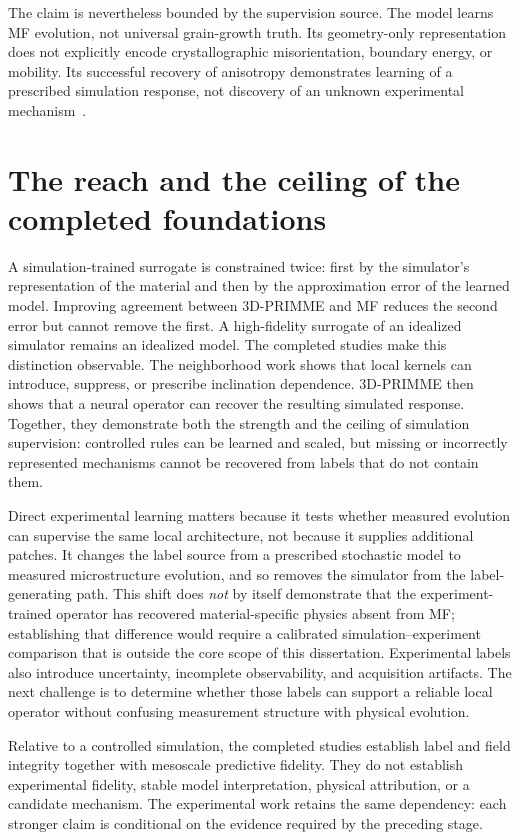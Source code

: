 \documentclass[proposalMode]{ufdissertation}
\begin{document}
The claim is nevertheless bounded by the supervision source. The model learns MF evolution, not universal grain-growth truth. Its geometry-only representation does not explicitly encode crystallographic misorientation, boundary energy, or mobility. Its successful recovery of anisotropy demonstrates learning of a prescribed simulation response, not discovery of an unknown experimental mechanism~\cite{tian2026threeDprimme}.

\bigskip

\section{The reach and the ceiling of the completed foundations}

A simulation-trained surrogate is constrained twice: first by the simulator's representation of the material and then by the approximation error of the learned model. Improving agreement between 3D-PRIMME and MF reduces the second error but cannot remove the first. A high-fidelity surrogate of an idealized simulator remains an idealized model.
The completed studies make this distinction observable. The neighborhood work shows that local kernels can introduce, suppress, or prescribe inclination dependence. 3D-PRIMME then shows that a neural operator can recover the resulting simulated response. Together, they demonstrate both the strength and the ceiling of simulation supervision: controlled rules can be learned and scaled, but missing or incorrectly represented mechanisms cannot be recovered from labels that do not contain them.

Direct experimental learning matters because it tests whether measured evolution can supervise the same local architecture, not because it supplies additional patches. It changes the label source from a prescribed stochastic model to measured microstructure evolution, and so removes the simulator from the label-generating path. This shift does \emph{not} by itself demonstrate that the experiment-trained operator has recovered material-specific physics absent from MF; establishing that difference would require a calibrated simulation--experiment comparison that is outside the core scope of this dissertation. Experimental labels also introduce uncertainty, incomplete observability, and acquisition artifacts. The next challenge is to determine whether those labels can support a reliable local operator without confusing measurement structure with physical evolution.

Relative to a controlled simulation, the completed studies establish label and field integrity together with mesoscale predictive fidelity. They do not establish experimental fidelity, stable model interpretation, physical attribution, or a candidate mechanism. The experimental work retains the same dependency: each stronger claim is conditional on the evidence required by the preceding stage.
\end{document}
